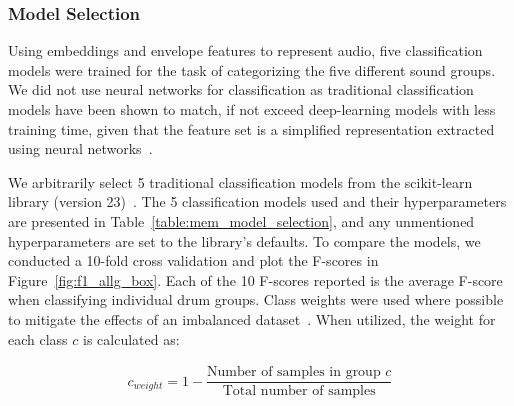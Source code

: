 \documentclass[\main/thesis.tex]{subfiles}
\begin{document}
\subsubsection{Model Selection}
Using embeddings and envelope features to represent audio, five classification models were trained for the task of categorizing the five different sound groups. We did not use neural networks for classification as traditional classification models have been shown to match, if not exceed deep-learning models with less training time, given that the feature set is a simplified representation extracted using neural networks~\cite{notley2018examining}.

 We arbitrarily select 5 traditional classification models from the scikit-learn library (version 23)~\cite{pedregosa2011scikit}. The 5 classification models used and their hyperparameters are presented in Table~\ref{table:mem_model_selection}, and any unmentioned hyperparameters are set to the library's defaults. To compare the models, we conducted a 10-fold cross validation and plot the F-scores in Figure~\ref{fig:f1_allg_box}. Each of the 10 F-scores reported is the average F-score when classifying individual drum groups. Class weights were used where possible to mitigate the effects of an imbalanced dataset~\cite{provost2000machine,chawla2004special}. When utilized, the weight for each class $c$ is calculated as:

\begin{subequations}
    \begin{align*}
    c_{weight} = 1-\dfrac{\text{Number of samples in group $c$} }{\text{Total number of samples}}
    \end{align*}
\end{subequations}
\end{document}
